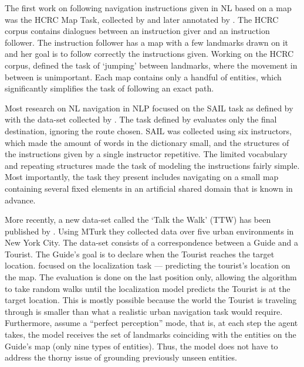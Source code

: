 \documentclass[11pt,a4paper]{article}
\begin{document}
The first work on following navigation instructions given in NL based on a map was the HCRC Map Task, collected by \citet{anderson1991hcrc} and later annotated by \citet{levit2007interpretation}. The HCRC   corpus  contains dialogues between an instruction giver and an instruction follower. The instruction follower has a map with a few landmarks drawn on it and her goal is to follow correctly the instructions given. Working on the HCRC corpus, \citet{vogel2010learning} defined the task of \enquote*{jumping} between landmarks, where the movement in between is unimportant. Each map contains only a handful of entities, which  significantly simplifies  the task of following an exact path.  


Most research on NL navigation in NLP \citep{macmahon2006walk,chen2011learning,kim2012unsupervised,kim2013adapting,artzi2013weakly,artzi2014learning,mei2015listen,fried2017unified,andreas2015alignment}  focused on the SAIL task as defined by \citet{chen2011learning} with the data-set collected by \citet{macmahon2006walk}. The task defined by \citet{chen2011learning} evaluates only the final destination, ignoring the route chosen. SAIL was collected using  six instructors, which made the amount of words in the dictionary small, and the structures of the instructions given by a single instructor  repetitive. The limited vocabulary and  repeating structures made the task of modeling the instructions fairly simple. Most importantly, the task they present includes navigating on a small map containing several fixed elements in an artificial shared domain that is known in advance.  

More recently,  a new data-set called the \enquote*{Talk the Walk} (TTW) has been published by \citet{de2018talk}. Using MTurk they collected data over five urban environments in New York City. The data-set consists of a correspondence between a Guide and a Tourist. The Guide's goal is to declare when the Tourist reaches the target location. \citet{de2018talk} focused on the localization task --- predicting the tourist's location on the map. The evaluation is done on the last position only, allowing the algorithm to take random walks until the localization model predicts the Tourist is at the target location. 
This is mostly possible because the world the Tourist is traveling through is smaller than what a realistic urban navigation task would require. Furthermore, \citet{de2018talk} assume a \enquote{perfect perception} mode, that is, at each step the agent takes, the model receives the set of  landmarks coinciding with the entities on the Guide's map (only nine types of entities). Thus, the model does not have to address the thorny issue of grounding previously unseen entities.
 
\end{document}

